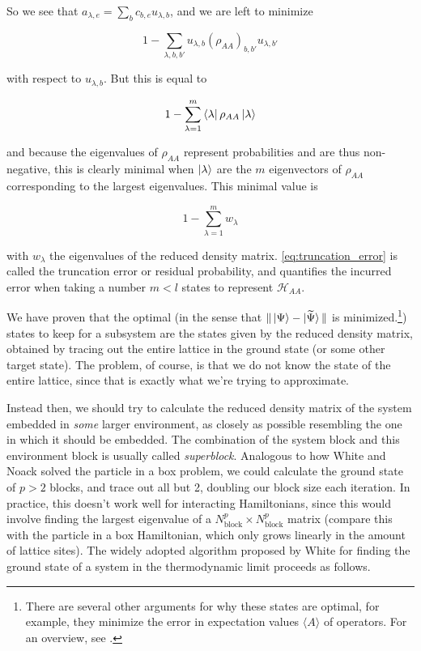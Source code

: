 So we see that $a_{\lambda, e} = \sum_{b} c_{b, e} u_{\lambda, b}$, and we are left to minimize

\begin{equation}
  1 - \sum_{\lambda, b, b'} u_{\lambda, b} (\rho_{AA})_{b, b'} u_{\lambda, b'}
\end{equation}

with respect to $u_{\lambda, b}$. But this is equal to

\begin{equation}
  1 - \sum_{\lambda = 1}^{m} \bra{\lambda} \rho_{AA} \ket{\lambda}
\end{equation}

and because the eigenvalues of $\rho_{AA}$ represent probabilities and are thus
non-negative, this is clearly minimal when $\ket{\lambda}$ are the $m$
eigenvectors of $\rho_{AA}$ corresponding to the largest eigenvalues. This minimal value is

\begin{equation}\label{eq:truncation_error}
  1 - \sum_{\lambda = 1}^{m} w_{\lambda}
\end{equation}

with $w_{\lambda}$ the eigenvalues of the reduced density matrix.
\eqref{eq:truncation_error} is called the truncation error or residual
probability, and quantifies the incurred error when taking a number $m < l$ states to
represent $\mathcal{H}_{AA}$.


We have proven that the optimal (in the sense that $\Vert \ket{\Psi}
- \ket{\widetilde{\Psi}} \Vert$ is minimized.\footnote{There are several other
arguments for why these states are optimal, for example, they minimize the
error in expectation values $\langle A \rangle$ of operators. For an overview,
see \cite{schollwock2005density}.}) states to keep for a subsystem are the
states given by the reduced density matrix, obtained by tracing out the entire
lattice in the ground state (or some other target state). The problem, of
course, is that we do not know the state of the entire lattice, since that is
exactly what we're trying to approximate.

Instead then, we should try to calculate the reduced density matrix of the
system embedded in \textit{some} larger environment, as closely as possible
resembling the one in which it should be embedded.  The combination of the
system block and this environment block is usually called \textit{superblock}.
Analogous to how White and Noack solved the particle in a box problem, we could
calculate the ground state of $p > 2$ blocks,
and trace out all but 2, doubling our block size each iteration. In
practice, this doesn't work well for interacting Hamiltonians, since this
would involve finding the largest eigenvalue of a $N_{\text{block}}^p
\times N_{\text{block}}^p$ matrix (compare this with the particle in a box
Hamiltonian, which only grows linearly in the amount of lattice sites).
The widely adopted algorithm proposed by White \cite{white1993density} for
finding the ground state of a system in the thermodynamic limit proceeds
as follows.


